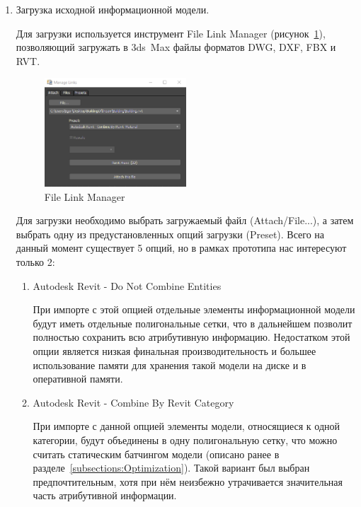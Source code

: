 \begin{enumerate}
    \item {
        Загрузка исходной информационной модели.

        Для загрузки используется инструмент File Link Manager
        (рисунок~\ref{figure:3DCMax-FileLinkManager}),
        позволяющий загружать в 3ds~Max файлы форматов DWG, DXF, FBX и RVT.
        \begin{figure}[ht]
            \centering
            \includegraphics[width=0.5\textwidth, frame]{images/3DSMax-FLM.png}
            \caption{File Link Manager}
            \label{figure:3DCMax-FileLinkManager}
        \end{figure}
        Для загрузки необходимо выбрать загружаемый файл (Attach/File...),
        а затем выбрать одну из предустановленных опций загрузки (Preset).
        Всего на данный момент существует 5 опций,
        но в рамках прототипа нас интересуют только 2:

        \begin{enumerate}
            \item {
                Autodesk Revit - Do Not Combine Entities

                При импорте с этой опцией отдельные элементы информационной модели
                будут иметь отдельные полигональные сетки, что в дальнейшем
                позволит полностью сохранить всю атрибутивную информацию.
                Недостатком этой опции является низкая финальная производительность
                и большее использование памяти для хранения такой модели
                на диске и в оперативной памяти.
            }
            \item {
                Autodesk Revit - Combine By Revit Category

                При импорте с данной опцией элементы модели, относящиеся к одной категории,
                будут объединены в одну полигональную сетку, что можно считать
                статическим батчингом модели (описано ранее
                в разделе~\ref{subsections:Optimization}).
                Такой вариант был выбран предпочтительным,
                хотя при нём неизбежно утрачивается
                значительная часть атрибутивной информации.
            }
        \end{enumerate}

}
\end{enumerate}

